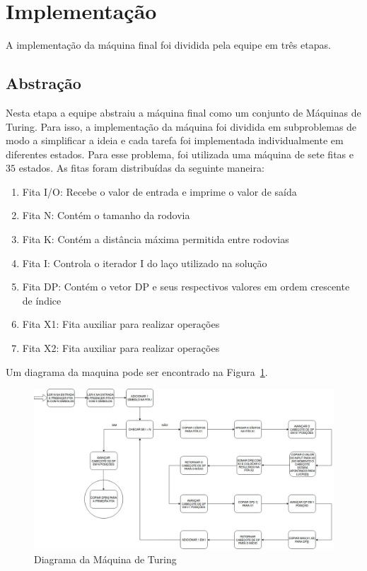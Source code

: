 \documentclass[a4paper]{article}
\begin{document}
\section{Implementação}

A implementação da máquina final foi dividida pela equipe em três etapas.

\subsection{Abstração}

Nesta etapa a equipe abstraiu a máquina final como um conjunto de Máquinas de Turing. Para isso, a implementação da máquina foi dividida em subproblemas de modo a simplificar a ideia e cada tarefa foi implementada individualmente em diferentes estados. Para esse problema, foi utilizada uma máquina de sete fitas e $35$ estados. As fitas foram distribuídas da seguinte maneira: 

\begin{enumerate}
\item Fita I/O: Recebe o valor de entrada e imprime o valor de saída
\item Fita N: Contém o tamanho da rodovia
\item Fita K: Contém a distância máxima permitida entre rodovias
\item Fita I: Controla o iterador I do laço utilizado na solução
\item Fita DP: Contém o vetor DP e seus respectivos valores em ordem crescente de índice
\item Fita X1: Fita auxiliar para realizar operações
\item Fita X2: Fita auxiliar para realizar operações
\end{enumerate}

\medskip
Um diagrama da maquina pode ser encontrado na Figura~\ref{fig:image}.

%    

\pagebreak
\begin{figure}[h]
\centering
\includegraphics[scale=0.30]{turing.jpg}
\caption{Diagrama da Máquina de Turing}
\label{fig:image}
\end{figure}
\end{document}
